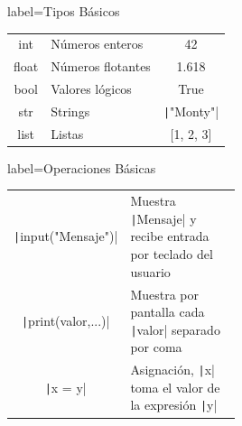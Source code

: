 \begin{contentbox}{label=Tipos Básicos}
    \centering
    \begin{tabular}{C|l|C}
        int & Números enteros & 42\\
        float & Números flotantes & 1.618\\
        bool & Valores lógicos & True \\
        str & Strings & \texttt|"Monty"| \\
        list & Listas & [1, 2, 3]
    \end{tabular}
\end{contentbox}

\begin{contentbox}{label=Operaciones Básicas}
    \begin{tabular}{C|p{0.5\linewidth}}
        \texttt|input("Mensaje")| & Muestra \texttt|Mensaje| y recibe entrada por teclado del usuario\\
        \texttt|print(valor,...)| & Muestra por pantalla cada \texttt|valor| separado por coma \\
        \texttt|x = y| & Asignación, \texttt|x| toma el valor de la expresión \texttt|y|
    \end{tabular}
\end{contentbox}

